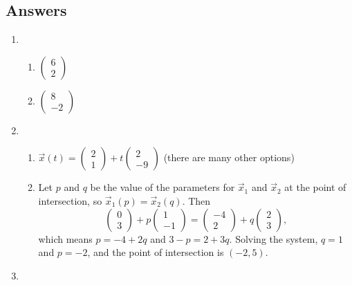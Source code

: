 \newpage
\subsection{Answers}

\begin{enumerate}
\item \begin{enumerate}
\item $\begin{pmatrix} 6 \\ 2 \end{pmatrix}$
\item $\begin{pmatrix} 8 \\ -2 \end{pmatrix}$
\end{enumerate}
\item \begin{enumerate}
\item $\vec{x}(t) = \begin{pmatrix} 2 \\ 1 \end{pmatrix} + t\begin{pmatrix} 2 \\ -9 \end{pmatrix}$ (there are many other options)
\item Let $p$ and $q$ be the value of the parameters for $\vec{x}_1$ and $\vec{x}_2$ at the point of intersection, so $\vec{x}_1(p) = \vec{x}_2(q)$. Then
\begin{equation*}
\begin{pmatrix} 0 \\ 3 \end{pmatrix} + p\begin{pmatrix} 1 \\ -1 \end{pmatrix} = \begin{pmatrix} -4 \\ 2 \end{pmatrix} + q\begin{pmatrix} 2 \\ 3 \end{pmatrix},
\end{equation*}
which means $p = -4 + 2q$ and $3 - p = 2 + 3q$. Solving the system, $q = 1$ and $p = -2$, and the point of intersection is $(-2,5)$.
\end{enumerate}
\item \begin{enumerate}

\end{enumerate}
\end{enumerate}
